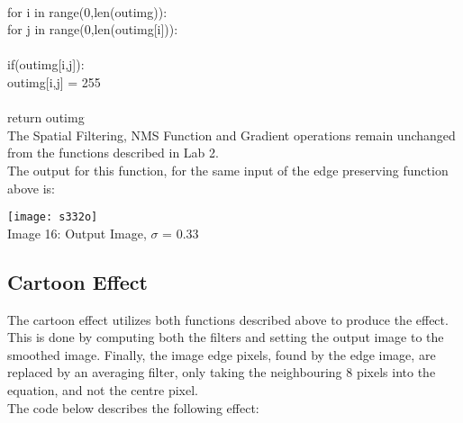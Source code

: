 \documentclass{article}
\begin{document}
	\\
	\indent for i in range(0,len(out\textunderscore img)):\\
	\indent \indent for j in range(0,len(out\textunderscore img[i])):\\
	\\
	\indent \indent \indent if(out\textunderscore img[i,j]):\\
	\indent \indent \indent \indent out\textunderscore img[i,j] = 255\\
	\\
	\indent return out\textunderscore img\\
	
	The Spatial Filtering, NMS Function and Gradient operations remain unchanged from the functions described in Lab 2.\\
	
	The output for this function, for the same input of the edge preserving function above is:\\
	
	\begin{center}
		
		\texttt{[image: s332o]}\\
		Image 16: Output Image, $\sigma$ = 0.33\\
		
	\end{center}

	\subsection{Cartoon Effect}

	The cartoon effect utilizes both functions described above to produce the effect. This is done by computing both the filters and setting the output image to the smoothed image. Finally, the image edge pixels, found by the edge image, are replaced by an averaging filter, only taking the neighbouring 8 pixels into the equation, and not the centre pixel.\\
	
	The code below describes the following effect:\\
	
\end{document}
